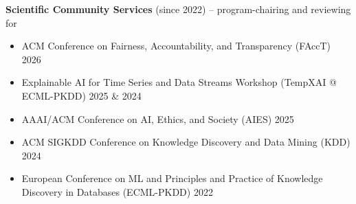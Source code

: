 \documentclass[12pt]{letter}
\begin{document}
\textbf{Scientific Community Services} (since 2022) -- program-chairing and reviewing for
{\footnotesize
\begin{itemize}[leftmargin=1.2em,noitemsep,topsep=0pt]
    \item ACM Conference on Fairness, Accountability, and Transparency (FAccT) 2026
    \item Explainable AI for Time Series and Data Streams Workshop (TempXAI @ ECML-PKDD) 2025 \& 2024
    \item AAAI/ACM Conference on AI, Ethics, and Society (AIES) 2025
    \item ACM SIGKDD Conference on Knowledge Discovery and Data Mining (KDD) 2024
    \item European Conference on ML and Principles and Practice of Knowledge Discovery in Databases (ECML-PKDD) 2022
\end{itemize}}
\end{document}
